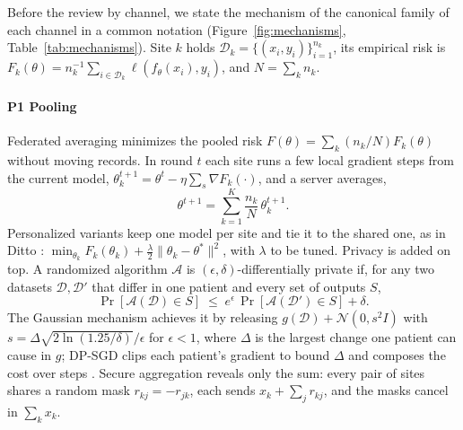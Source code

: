 \documentclass[acmsmall,screen,review]{acmart}
\theoremstyle{acmdefinition}
\begin{document}
Before the review by channel, we state the mechanism of the canonical family of each channel in a common notation (Figure~\ref{fig:mechanisms}, Table~\ref{tab:mechanisms}). Site $k$ holds $\mathcal{D}_k=\{(x_i,y_i)\}_{i=1}^{n_k}$, its empirical risk is $F_k(\theta)=n_k^{-1}\sum_{i\in\mathcal{D}_k}\ell(f_\theta(x_i),y_i)$, and $N=\sum_k n_k$.

\paragraph{P1 Pooling} Federated averaging \cite{mcmahan2017communication} minimizes the pooled risk $F(\theta)=\sum_{k}(n_k/N)F_k(\theta)$ without moving records. In round $t$ each site runs a few local gradient steps from the current model, $\theta_k^{t+1}=\theta^{t}-\eta\sum_{s}\nabla F_k(\cdot)$, and a server averages,
\begin{equation}\label{eq:fedavg}
\theta^{t+1}=\sum_{k=1}^{K}\frac{n_k}{N}\,\theta_k^{t+1}.
\end{equation}
Personalized variants keep one model per site and tie it to the shared one, as in Ditto \cite{li2021ditto}: $\min_{\theta_k}F_k(\theta_k)+\tfrac{\lambda}{2}\|\theta_k-\theta^{\ast}\|^2$, with $\lambda$ to be tuned. Privacy is added on top. A randomized algorithm $\mathcal{A}$ is $(\epsilon,\delta)$-differentially private \cite{dwork2006calibrating,dwork2014algorithmic} if, for any two datasets $\mathcal{D},\mathcal{D}'$ that differ in one patient and every set of outputs $S$,
\begin{equation}\label{eq:dp}
\Pr[\mathcal{A}(\mathcal{D})\in S]\;\le\;e^{\epsilon}\,\Pr[\mathcal{A}(\mathcal{D}')\in S]+\delta .
\end{equation}
The Gaussian mechanism achieves it by releasing $g(\mathcal{D})+\mathcal{N}(0,s^2I)$ with $s=\Delta\sqrt{2\ln(1.25/\delta)}/\epsilon$ for $\epsilon<1$, where $\Delta$ is the largest change one patient can cause in $g$; DP-SGD clips each patient's gradient to bound $\Delta$ and composes the cost over steps \cite{abadi2016deep}. Secure aggregation \cite{bonawitz2017practical} reveals only the sum: every pair of sites shares a random mask $r_{kj}=-r_{jk}$, each sends $x_k+\sum_{j}r_{kj}$, and the masks cancel in $\sum_k x_k$.
\end{document}
